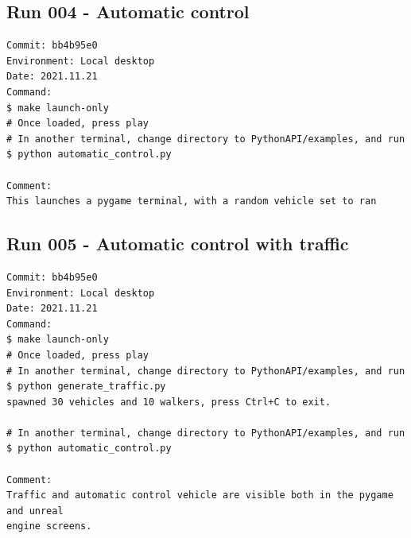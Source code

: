 \subsection{Run 004 - Automatic control}
\label{app_res:004}
\begin{verbatim}
Commit: bb4b95e0
Environment: Local desktop
Date: 2021.11.21
Command:
$ make launch-only
# Once loaded, press play
# In another terminal, change directory to PythonAPI/examples, and run
$ python automatic_control.py

Comment:
This launches a pygame terminal, with a random vehicle set to ran
\end{verbatim}

\subsection{Run 005 - Automatic control with traffic}
\label{app_res:005}
\begin{verbatim}
Commit: bb4b95e0
Environment: Local desktop
Date: 2021.11.21
Command:
$ make launch-only
# Once loaded, press play
# In another terminal, change directory to PythonAPI/examples, and run
$ python generate_traffic.py 
spawned 30 vehicles and 10 walkers, press Ctrl+C to exit.

# In another terminal, change directory to PythonAPI/examples, and run
$ python automatic_control.py

Comment:
Traffic and automatic control vehicle are visible both in the pygame and unreal 
engine screens.
\end{verbatim}

